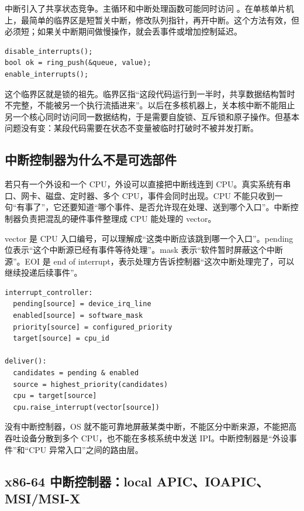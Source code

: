 中断引入了共享状态竞争。主循环和中断处理函数可能同时访问 。在单核单片机上，最简单的临界区是短暂关中断，修改队列指针，再开中断。这个方法有效，但必须短；如果关中断期间做慢操作，就会丢事件或增加控制延迟。

\begin{lstlisting}
disable_interrupts();
bool ok = ring_push(&queue, value);
enable_interrupts();
\end{lstlisting}

这个临界区就是锁的祖先。临界区指“这段代码运行到一半时，共享数据结构暂时不完整，不能被另一个执行流插进来”。以后在多核机器上，关本核中断不能阻止另一个核心同时访问同一数据结构，于是需要自旋锁、互斥锁和原子操作。但基本问题没有变：某段代码需要在状态不变量被临时打破时不被并发打断。

\subsection{中断控制器为什么不是可选部件}

若只有一个外设和一个 CPU，外设可以直接把中断线连到 CPU。真实系统有串口、网卡、磁盘、定时器、多个 CPU，事件会同时出现。CPU 不能只收到一句“有事了”，它还要知道“哪个事件、是否允许现在处理、送到哪个入口”。中断控制器负责把混乱的硬件事件整理成 CPU 能处理的 vector。

vector 是 CPU 入口编号，可以理解成“这类中断应该跳到哪一个入口”。pending 位表示“这个中断源已经有事件等待处理”。mask 表示“软件暂时屏蔽这个中断源”。EOI 是 end of interrupt，表示处理方告诉控制器“这次中断处理完了，可以继续投递后续事件”。

\begin{lstlisting}
interrupt_controller:
  pending[source] = device_irq_line
  enabled[source] = software_mask
  priority[source] = configured_priority
  target[source] = cpu_id

deliver():
  candidates = pending & enabled
  source = highest_priority(candidates)
  cpu = target[source]
  cpu.raise_interrupt(vector[source])
\end{lstlisting}

没有中断控制器，OS 就不能可靠地屏蔽某类中断，不能区分中断来源，不能把高吞吐设备分散到多个 CPU，也不能在多核系统中发送 IPI。中断控制器是“外设事件”和“CPU 异常入口”之间的路由层。

\subsection{x86-64 中断控制器：local APIC、IOAPIC、MSI/MSI-X}

